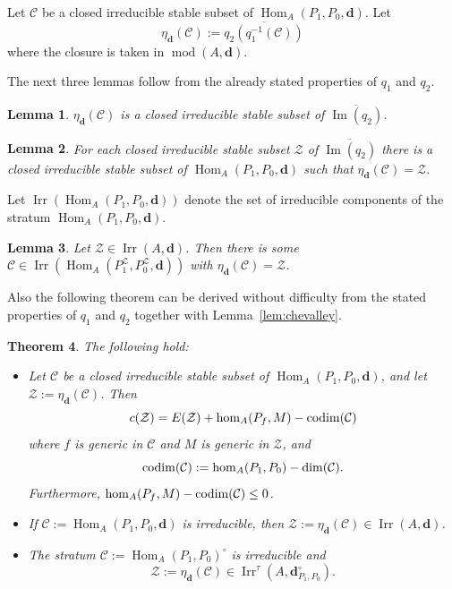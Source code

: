 \documentclass[12pt,reqno]{amsart}
\newtheorem{Thm}{Theorem}[section]
\newtheorem{Lem}[Thm]{Lemma}
\theoremstyle{definition}
\newcommand{\cC}{{\mathcal C}}
\newcommand{\bd}{\mathbf{d}}
\newcommand{\md}{\operatorname{mod}}
\newcommand{\Hom}{\operatorname{Hom}}
\newcommand{\Ima}{\operatorname{Im}}
\newcommand{\irr}{\operatorname{Irr}}
\newcommand{\calZ}{\mathcal{Z}}
\begin{document}
Let $\cC$ be a closed irreducible stable subset
of $\Hom_A(P_1,P_0,\bd)$.
Let
$$
\eta_\bd(\cC) := \overline{q_2(q_1^{-1}(\cC))}
$$
where the closure is taken in $\md(A,\bd)$.


The next three lemmas follow from the already stated properties
of $q_1$ and $q_2$.

\begin{Lem}
$\eta_\bd(\cC)$ is a closed irreducible stable subset of
$\overline{\Ima(q_2)}$.
\end{Lem}


\begin{Lem}
For each closed irreducible stable subset $\calZ$ of
$\overline{\Ima(q_2)}$ there is a
closed irreducible stable subset of $\Hom_A(P_1,P_0,\bd)$
such that $\eta_\bd(\cC) = \calZ$.
\end{Lem}


Let $\irr(\Hom_A(P_1,P_0,\bd))$ denote the set of irreducible components
of the stratum $\Hom_A(P_1,P_0,\bd)$.

\begin{Lem}\label{lem:imageq2}
Let $\calZ \in \irr(A,\bd)$.
Then there is some
$\cC \in \irr(\Hom_A(P_1^{\calZ},P_0^{\calZ},\bd))$
with $\eta_\bd(\cC) = \calZ$.
\end{Lem}



Also
the following theorem can be derived without difficulty from the stated properties of $q_1$ and $q_2$ together with Lemma~\ref{lem:chevalley}.



\begin{Thm}\label{thm:bundle1}
The following hold:
\begin{itemize}\itemsep2mm

\item[(i)]
Let $\cC$ be a closed irreducible stable subset of
$\Hom_A(P_1,P_0,\bd)$, and let $\calZ := \eta_\bd(\cC)$.
Then
$$
c(\calZ) = E(\calZ) + \hom_A(P_f,M) - {\rm codim}(\cC)
$$
where $f$ is generic in $\cC$ and $M$ is generic in $\calZ$, and
$$
{\rm codim}(\cC) := \hom_A(P_1,P_0) - \dim(\cC).
$$
Furthermore,
$\hom_A(P_f,M) - {\rm codim}(\cC) \le 0$.

\item[(ii)]
If $\cC := \Hom_A(P_1,P_0,\bd)$ is irreducible, then
$\calZ := \eta_\bd(\cC) \in \irr(A,\bd)$.

\item[(iii)]
The stratum
$\cC := \Hom_A(P_1,P_0)^\circ$ is irreducible and
$$
\calZ := \eta_\bd(\cC) \in \irr^\tau(A,\bd_{P_1,P_0}^\circ).
$$

\end{itemize}
\end{Thm}
\end{document}
